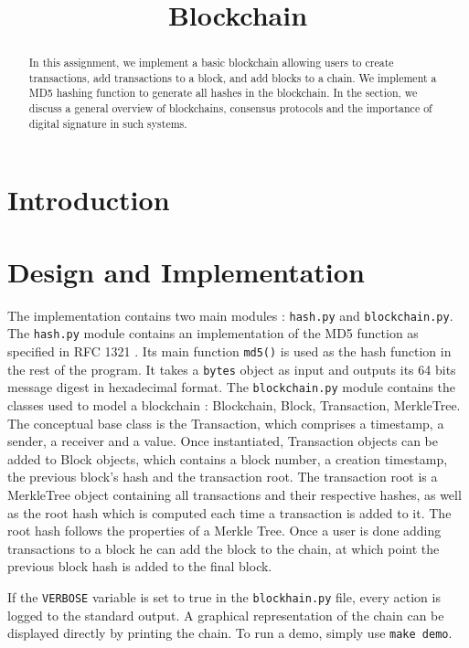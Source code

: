 \documentclass{article}
\title{\textbf{Blockchain}}
\author{}
\date{}
\begin{document}
\maketitle \thispagestyle{fancy}

\begin{abstract}
    In this assignment, we implement a basic blockchain allowing users to create transactions, add transactions to a block, and add blocks to a chain. We implement a MD5 hashing function to generate all hashes in the blockchain. In the  section, we discuss a general overview of blockchains, consensus protocols and the importance of digital signature in such systems.
\end{abstract}

\section{Introduction}
 
\section{Design and Implementation}

The implementation contains two main modules : \verb+hash.py+ and \verb+blockchain.py+. The \verb+hash.py+ module contains an implementation of the MD5 function as specified in RFC 1321 \cite{RFC1321}. Its main function \verb+md5()+ is used as the hash function in the rest of the program. It takes a \verb+bytes+ object as input and outputs its 64 bits message digest in hexadecimal format.
The \verb+blockchain.py+ module contains the classes used to model a blockchain : Blockchain, Block, Transaction, MerkleTree. The conceptual base class is the Transaction, which comprises a timestamp, a sender, a receiver and a value. Once instantiated, Transaction objects can be added to Block objects, which contains a block number, a creation timestamp, the previous block's hash and the transaction root. The transaction root is a MerkleTree object containing all transactions and their respective hashes, as well as the root hash which is computed each time a transaction is added to it. The root hash follows the properties of a Merkle Tree\cite{wiki:merkletree}. Once a user is done adding transactions to a block he can add the block to the chain, at which point the previous block hash is added to the final block.

\bigskip

If the \verb+VERBOSE+ variable is set to true in the \verb+blockhain.py+ file, every action is logged to the standard output. A graphical representation of the chain can be displayed directly by printing the chain. To run a demo, simply use \verb+make demo+.
\end{document}
